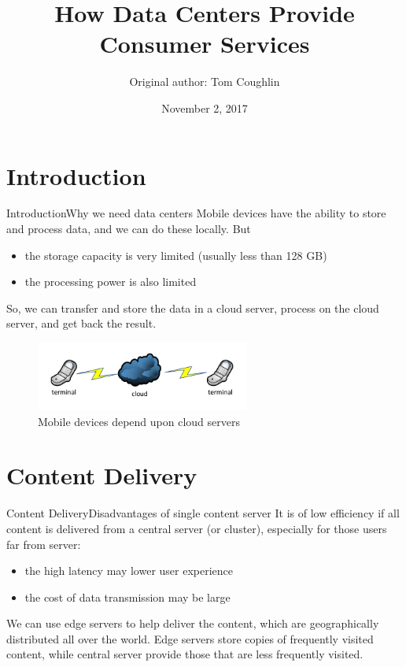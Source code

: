 \documentclass{beamer}
\title[How Data Centers Provide Consumer Services]{How Data Centers Provide Consumer Services}
\institute{}
\author{Original author: Tom Coughlin}
\date{November 2, 2017}
\begin{document}
  \begin{frame}
    \titlepage
  \end{frame}

  \section{Introduction}
  \begin{frame}{Introduction}{Why we need data centers}
    Mobile devices have the ability to store and process data, and we can do these locally. But
    \pause
    \begin{itemize}
      \item the storage capacity is very limited (usually less than 128 GB)
      \item the processing power is also limited
    \end{itemize}
    \pause
    So, we can transfer and store the data in a cloud server, process on the cloud server, and get back the result.
    \begin{figure}
        \includegraphics[width = 7cm]{topo1.pdf}
        \caption{Mobile devices depend upon cloud servers}
    \end{figure}
  \end{frame}

  \section{Content Delivery}
  \begin{frame}{Content Delivery}{Disadvantages of single content server}
    It is of low efficiency if all content is delivered from a central server (or cluster), especially for those users far from server:
    \begin{itemize}
      \item the high latency may lower user experience
      \item the cost of data transmission may be large
    \end{itemize}
    \pause
    We can use edge servers to help deliver the content, which are geographically distributed all over the world.
    Edge servers store copies of frequently visited content, while central server provide those that are less frequently visited.
  \end{frame}
\end{document}
